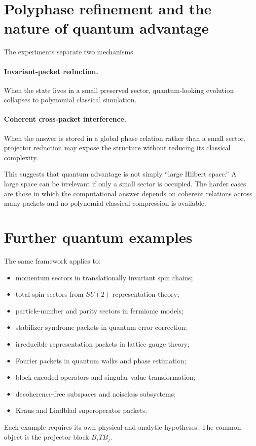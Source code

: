 \documentclass[11pt]{article}
\begin{document}
\section{Polyphase refinement and the nature of quantum advantage}

The experiments separate two mechanisms.

\paragraph{Invariant-packet reduction.}
When the state lives in a small preserved sector, quantum-looking evolution collapses to polynomial classical simulation.

\paragraph{Coherent cross-packet interference.}
When the answer is stored in a global phase relation rather than a small sector, projector reduction may expose the structure without reducing its classical complexity.

This suggests that quantum advantage is not simply ``large Hilbert space.''  A large space can be irrelevant if only a small sector is occupied.  The harder cases are those in which the computational answer depends on coherent relations across many packets and no polynomial classical compression is available.

\section{Further quantum examples}

The same framework applies to:
\begin{itemize}
\item momentum sectors in translationally invariant spin chains;
\item total-spin sectors from $SU(2)$ representation theory;
\item particle-number and parity sectors in fermionic models;
\item stabilizer syndrome packets in quantum error correction;
\item irreducible representation packets in lattice gauge theory;
\item Fourier packets in quantum walks and phase estimation;
\item block-encoded operators and singular-value transformation;
\item decoherence-free subspaces and noiseless subsystems;
\item Kraus and Lindblad superoperator packets.
\end{itemize}
Each example requires its own physical and analytic hypotheses.  The common object is the projector block $B_iTB_j$.
\end{document}

